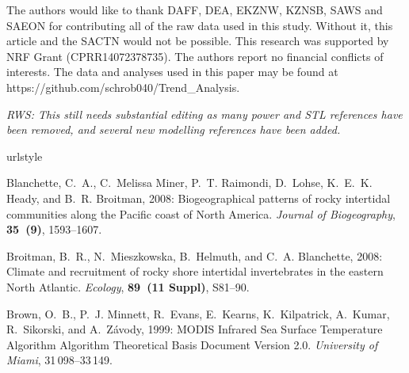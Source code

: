 \documentclass{ametsoc}
\begin{document}
\acknowledgments
The authors would like to thank DAFF, DEA, EKZNW, KZNSB, SAWS and SAEON for contributing all of the raw data used in this study. Without it, this article and the SACTN would not be possible. This research was supported by NRF Grant (CPRR14072378735). The authors report no financial conflicts of interests. The data and analyses used in this paper may be found at https://github.com/schrob040/Trend_Analysis.

%
\emph{RWS: This still needs substantial editing as many power and STL references have been removed, and several new modelling references have been added.}
\begin{thebibliography}{23}
\providecommand{\natexlab}[1]{#1}
\providecommand{\url}[1]{\texttt{#1}}
\renewcommand{\UrlFont}{\rmfamily}
\providecommand{\urlprefix}{URL }
\expandafter\ifx\csname urlstyle\endcsname\relax
  \providecommand{\doi}[1]{doi:\discretionary{}{}{}#1}\else
  \providecommand{\doi}{doi:\discretionary{}{}{}\begingroup
  \urlstyle{rm}\Url}\fi
\providecommand{\eprint}[2][]{\url{#2}}

Blanchette, C.~A., C.~{Melissa Miner}, P.~T. Raimondi, D.~Lohse, K.~E.~K.
  Heady, and B.~R. Broitman, 2008: {Biogeographical patterns of rocky
  intertidal communities along the Pacific coast of North America}.
  \textit{Journal of Biogeography}, \textbf{35~(9)}, 1593--1607.

Broitman, B.~R., N.~Mieszkowska, B.~Helmuth, and C.~A. Blanchette, 2008:
  {Climate and recruitment of rocky shore intertidal invertebrates in the
  eastern North Atlantic.} \textit{Ecology}, \textbf{89~(11 Suppl)}, S81--90.

Brown, O.~B., P.~J. Minnett, R.~Evans, E.~Kearns, K.~Kilpatrick, A.~Kumar,
  R.~Sikorski, and A.~Z{\'{a}}vody, 1999: {MODIS Infrared Sea Surface
  Temperature Algorithm Algorithm Theoretical Basis Document Version 2.0}.
  \textit{University of Miami}, 31\,098--33\,149.



\end{thebibliography}
\end{document}
